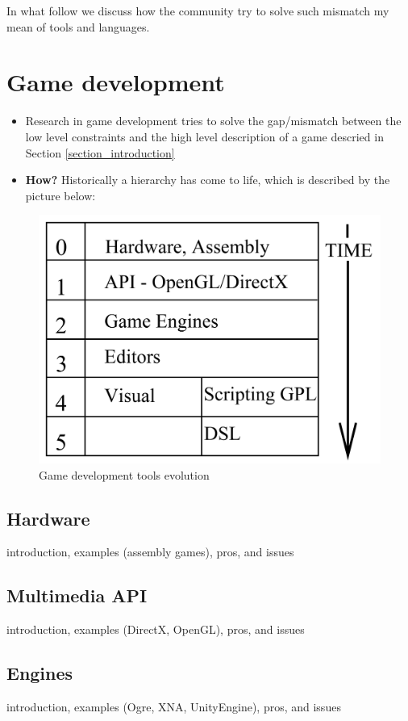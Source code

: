 \documentclass[10pt,a4paper]{article}
\begin{document}
In what follow we discuss how the community try to solve such mismatch my mean of tools and languages.

\section{Game development}
\begin{itemize}
\item Research in game development tries to solve the gap/mismatch between the low level constraints and the high level description of a game descried in Section \ref{section_introduction}
\item \textbf{How?} Historically a hierarchy has come to life, which is described by the picture below:
\end{itemize}

\begin{figure}[H]
\centering
\includegraphics[scale=0.5]{game_development_evolution.png}
\caption{Game development tools evolution}\label{game_dvelopment}
\end{figure}

\subsection{Hardware} introduction, examples (assembly games), pros, and issues
\subsection{Multimedia API} introduction, examples (DirectX, OpenGL), pros, and issues
\subsection{Engines} introduction, examples (Ogre, XNA, UnityEngine), pros, and issues
\end{document}
